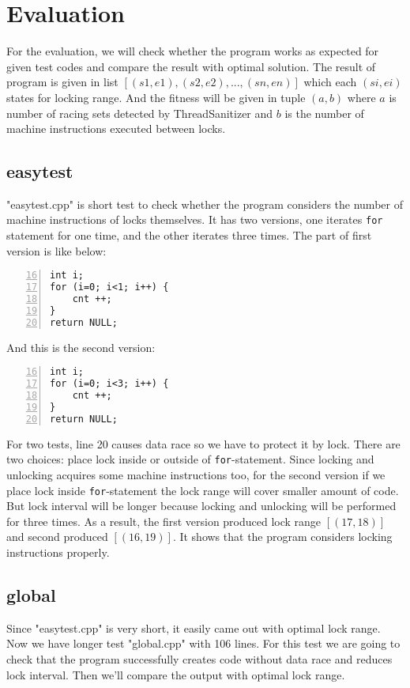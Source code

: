 \section{Evaluation}
For the evaluation, we will check whether the program works as expected for given test codes and compare the result with optimal solution. The result of program is given in list $[(s1, e1), (s2, e2), ..., (sn, en)]$ which each $(si, ei)$ states for locking range. And the fitness will be given in tuple $(a, b)$ where $a$ is number of racing sets detected by ThreadSanitizer and $b$ is the number of machine instructions executed between locks.

\subsection{easytest}
"easytest.cpp" is short test to check whether the program considers the number of machine instructions of locks themselves. It has two versions, one iterates \verb|for| statement for one time, and the other iterates three times. The part of first version is like below:

\begin{lstlisting}[frame=tb, xleftmargin=2em, framexleftmargin=1.5em, numbers=left, firstnumber=16]
int i;
for (i=0; i<1; i++) {
    cnt ++;
}
return NULL;
\end{lstlisting}

And this is the second version:

\begin{lstlisting}[frame=tb, xleftmargin=2em, framexleftmargin=1.5em, numbers=left, firstnumber=16]
int i;
for (i=0; i<3; i++) {
    cnt ++;
}
return NULL;
\end{lstlisting}

For two tests, line 20 causes data race so we have to protect it by lock. There are two choices: place lock inside or outside of \verb|for|-statement. Since locking and unlocking acquires some machine instructions too, for the second version if we place lock inside \verb|for|-statement the lock range will cover smaller amount of code. But lock interval will be longer because locking and unlocking will be performed for three times.
As a result, the first version produced lock range $[(17, 18)]$ and second produced $[(16, 19)]$. It shows that the program considers locking instructions properly.

\subsection{global}
Since "easytest.cpp" is very short, it easily came out with optimal lock range. Now we have longer test "global.cpp" with 106 lines. For this test we are going to check that the program successfully creates code without data race and reduces lock interval. Then we'll compare the output with optimal lock range.


